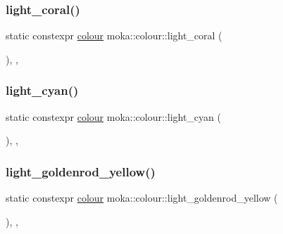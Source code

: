 \mbox{\label{classmoka_1_1colour_ab63863d1a2c98380a5e053005d5ef49b}} 
\subsubsection{\texorpdfstring{light\_coral()}{light\_coral()}}
{\footnotesize\ttfamily static constexpr \mbox{\hyperlink{classmoka_1_1colour}{colour}} moka\+::colour\+::light\+\_\+coral (\begin{DoxyParamCaption}{ }\end{DoxyParamCaption})\hspace{0.3cm}{\ttfamily [inline]}, {\ttfamily [static]}, {\ttfamily [noexcept]}}

\mbox{\label{classmoka_1_1colour_a12b432469d965a7925083d7764599f3e}} 
\subsubsection{\texorpdfstring{light\_cyan()}{light\_cyan()}}
{\footnotesize\ttfamily static constexpr \mbox{\hyperlink{classmoka_1_1colour}{colour}} moka\+::colour\+::light\+\_\+cyan (\begin{DoxyParamCaption}{ }\end{DoxyParamCaption})\hspace{0.3cm}{\ttfamily [inline]}, {\ttfamily [static]}, {\ttfamily [noexcept]}}

\mbox{\label{classmoka_1_1colour_aebe01473b0f4a8a01367e12379f97f8e}} 
\subsubsection{\texorpdfstring{light\_goldenrod\_yellow()}{light\_goldenrod\_yellow()}}
{\footnotesize\ttfamily static constexpr \mbox{\hyperlink{classmoka_1_1colour}{colour}} moka\+::colour\+::light\+\_\+goldenrod\+\_\+yellow (\begin{DoxyParamCaption}{ }\end{DoxyParamCaption})\hspace{0.3cm}{\ttfamily [inline]}, {\ttfamily [static]}, {\ttfamily [noexcept]}}

